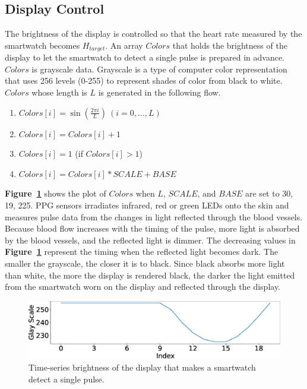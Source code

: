 \documentclass[sigchi,authordraft]{acmart}
\newcommand\figref[1]{\textbf{Figure~\ref{fig:#1}}}
\begin{document}
\subsection{Display Control}
\label{subsec:display_control}
The brightness of the display is controlled so that the heart rate measured by the smartwatch becomes $H_{target}$. An array $Colors$ that holds the brightness of the display to let the smartwatch to detect a single pulse is prepared in advance.
$Colors$ is grayscale data. Grayscale is a type of computer color representation that uses 256 levels (0-255) to represent shades of color from black to white. $Colors$ whose length is $L$ is generated in the following flow.
\begin{enumerate}
  \renewcommand{\labelenumi}{\arabic{enumi}.}
  \item $Colors[i]=\sin\left(\frac{2\pi i}{L}\right)~(i=0,\dots,L)$
  \item $Colors[i]=Colors[i]+1$
  \item $Colors[i]=1$ (if $Colors[i]>1$)
  \item $Colors[i]=Colors[i]*SCALE+BASE$
\end{enumerate}
\figref{colors_wave} shows the plot of $Colors$ when $L$, $SCALE$, and $BASE$ are set to 30, 19, 225. PPG sensors irradiates infrared, red or green LEDs onto the skin and measures pulse data from the changes in light reflected through the blood vessels. Because blood flow increases with the timing of the pulse, more light is absorbed by the blood vessels, and the reflected light is dimmer. The decreasing values in  \figref{colors_wave} represent the timing when the reflected light becomes dark. The smaller the grayscale, the closer it is to black. Since black absorbs more light than white, the more the display is rendered black, the darker the light emitted from the smartwatch worn on the display and reflected through the display.\par

\begin{figure}[!t]
  \centering
  \includegraphics[width=1\linewidth]{figures/colors_wave.eps}
  \caption{Time-series brightness of the display that makes a smartwatch detect a single pulse.}
  \label{fig:colors_wave}
\end{figure}
\end{document}
